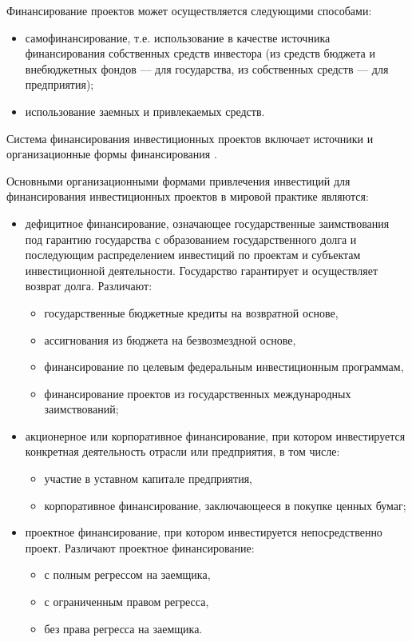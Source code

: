 Финансирование проектов может осуществляется следующими способами:
\begin{itemize}
	\item самофинансирование, т.е. использование в качестве источника финансирования собственных средств инвестора (из средств бюджета и внебюджетных фондов --- для государства, из собственных средств --- для предприятия);
	\item использование заемных и привлекаемых средств.
\end{itemize}

Система финансирования инвестиционных проектов включает источники и организационные формы финансирования \cite[268--269]{mazur}.

Основными организационными формами привлечения инвестиций для финансирования инвестиционных проектов в мировой практике являются:
\begin{itemize}
\item  дефицитное финансирование, означающее государственные заимствования под гарантию государства с образованием государственного долга и последующим распределением инвестиций по проектам и субъектам инвестиционной деятельности. Государство гарантирует и осуществляет возврат долга. Различают:
	\begin{itemize}
		\item государственные бюджетные кредиты на возвратной основе,
		\item ассигнования из бюджета на безвозмездной основе,
		\item финансирование по целевым федеральным инвестиционным программам,
		\item финансирование проектов из государственных международных заимствований;
	\end{itemize}
\item акционерное или корпоративное финансирование, при котором инвестируется конкретная деятельность отрасли или предприятия, в том числе:
	\begin{itemize}
		\item участие в уставном капитале предприятия,
		\item корпоративное финансирование, заключающееся в покупке ценных бумаг;
	\end{itemize}
\item проектное финансирование, при котором инвестируется непосредственно проект. Различают проектное финансирование:
	\begin{itemize}
		\item с полным регрессом на заемщика,
		\item с ограниченным правом регресса,
		\item без права регресса на заемщика.
	\end{itemize}
\end{itemize}




